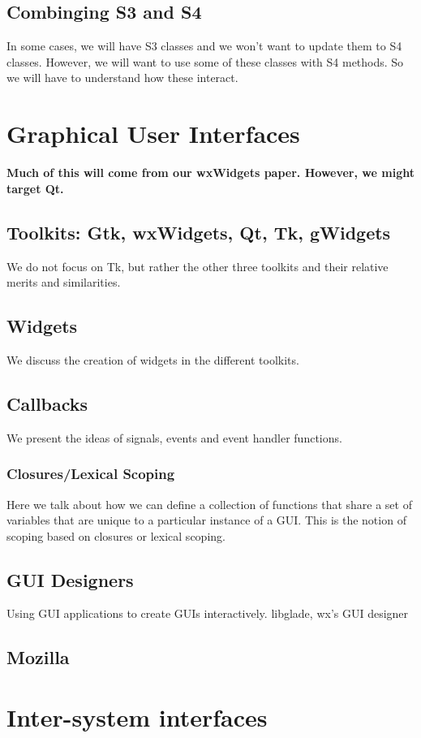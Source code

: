 \documentclass[11pt]{book}
\begin{document}
 \section{Combinging S3 and S4}
 In some cases, we will have S3 classes and we won't want to update
  them to S4 classes.  However, we will want to use some of these classes
  with S4 methods.  So we will have to understand how these interact.


\chapter{Graphical User Interfaces}
\textbf{Much of this will come from our wxWidgets paper.
However, we might target Qt.}

  \section{Toolkits: Gtk, wxWidgets, Qt, Tk, gWidgets}
   We do not focus on Tk, but rather the other three toolkits and
   their relative merits and similarities.
  \section{Widgets}
    We discuss the creation of widgets in the different toolkits.
  \section{Callbacks}
    We present the ideas of signals, events and event handler functions.
   \subsection{Closures/Lexical Scoping}
     Here  we talk about how we can define a collection of functions
     that  share a set of variables that are unique to a particular
     instance of a GUI. 
     This is the notion of scoping based on closures or lexical scoping.
  
  \section{GUI Designers}
     Using GUI applications to create GUIs interactively.
     libglade, wx's GUI designer
  \section{Mozilla}

\chapter{Inter-system interfaces}
\end{document}
